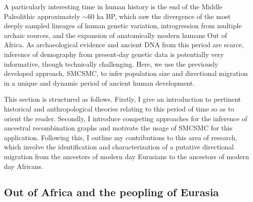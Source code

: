 A particularly interesting time in human history is the end of the Middle Paleolithic approximately $\sim$60 ka BP, which saw the divergence of the most deeply sampled lineages of human genetic variation, introgression from multiple archaic sources, and the expansion of anatomically modern humans Out of Africa. 
As archaeological evidence and ancient DNA from this period are scarce, inference of demography from present-day genetic data is potentially very informative, though technically challenging. Here, we use the previously developed approach, SMCSMC, to infer population size and directional migration in a unique and dynamic period of ancient human development.

This section is structured as follows. Firstly, I give an introduction to pertinent historical and anthropological theories relating to this period of time so as to orient the reader. Secondly, I introduce competing approaches for the inference of ancestral recombination graphs and motivate the usage of SMCSMC for this application. Following this, I outline my contributions to this area of research, which involve the identification and characterization of a putative directional migration from the ancestors of modern day Eurasians to the ancestors of modern day Africans. 


\subsection{Out of Africa and the peopling of Eurasia}


